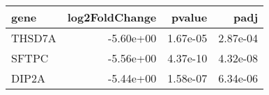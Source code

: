 \begin{tabular}{lrrr}
\toprule
  gene &  log2FoldChange &   pvalue &     padj \\
\midrule
THSD7A &       -5.60e+00 & 1.67e-05 & 2.87e-04 \\
 SFTPC &       -5.56e+00 & 4.37e-10 & 4.32e-08 \\
 DIP2A &       -5.44e+00 & 1.58e-07 & 6.34e-06 \\
\bottomrule
\end{tabular}
